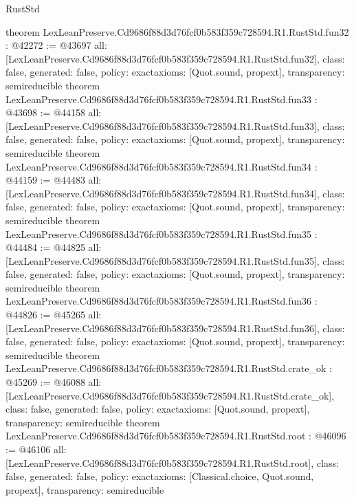 \begin{lexlean}{RustStd}
\begin{coremodule}
{}
theorem LexLeanPreserve.Cd9686f88d3d76fcf0b583f359c728594.R1.RustStd.fun32 : @42272 := @43697 {
  all: [LexLeanPreserve.Cd9686f88d3d76fcf0b583f359c728594.R1.RustStd.fun32],
  class: false,
  generated: false,
  policy: exact{axioms: [Quot.sound, propext]},
  transparency: semireducible
}
theorem LexLeanPreserve.Cd9686f88d3d76fcf0b583f359c728594.R1.RustStd.fun33 : @43698 := @44158 {
  all: [LexLeanPreserve.Cd9686f88d3d76fcf0b583f359c728594.R1.RustStd.fun33],
  class: false,
  generated: false,
  policy: exact{axioms: [Quot.sound, propext]},
  transparency: semireducible
}
theorem LexLeanPreserve.Cd9686f88d3d76fcf0b583f359c728594.R1.RustStd.fun34 : @44159 := @44483 {
  all: [LexLeanPreserve.Cd9686f88d3d76fcf0b583f359c728594.R1.RustStd.fun34],
  class: false,
  generated: false,
  policy: exact{axioms: [Quot.sound, propext]},
  transparency: semireducible
}
theorem LexLeanPreserve.Cd9686f88d3d76fcf0b583f359c728594.R1.RustStd.fun35 : @44484 := @44825 {
  all: [LexLeanPreserve.Cd9686f88d3d76fcf0b583f359c728594.R1.RustStd.fun35],
  class: false,
  generated: false,
  policy: exact{axioms: [Quot.sound, propext]},
  transparency: semireducible
}
theorem LexLeanPreserve.Cd9686f88d3d76fcf0b583f359c728594.R1.RustStd.fun36 : @44826 := @45265 {
  all: [LexLeanPreserve.Cd9686f88d3d76fcf0b583f359c728594.R1.RustStd.fun36],
  class: false,
  generated: false,
  policy: exact{axioms: [Quot.sound, propext]},
  transparency: semireducible
}
theorem LexLeanPreserve.Cd9686f88d3d76fcf0b583f359c728594.R1.RustStd.crate_ok : @45269 := @46088 {
  all: [LexLeanPreserve.Cd9686f88d3d76fcf0b583f359c728594.R1.RustStd.crate_ok],
  class: false,
  generated: false,
  policy: exact{axioms: [Quot.sound, propext]},
  transparency: semireducible
}
theorem LexLeanPreserve.Cd9686f88d3d76fcf0b583f359c728594.R1.RustStd.root : @46096 := @46106 {
  all: [LexLeanPreserve.Cd9686f88d3d76fcf0b583f359c728594.R1.RustStd.root],
  class: false,
  generated: false,
  policy: exact{axioms: [Classical.choice, Quot.sound, propext]},
  transparency: semireducible
}


\end{coremodule}
\end{lexlean}
